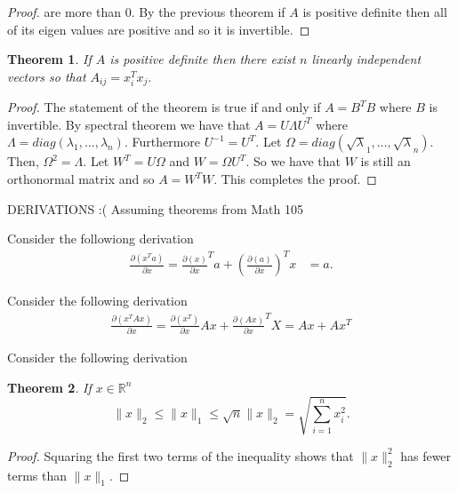 \documentclass[letter]{article}
\newtheorem{theorem}{Theorem}
\newenvironment{menumerate}{%
  \edef\backupindent{\the\parindent}%
  \enumerate%
  \setlength{\parindent}{\backupindent}%
}{\endenumerate}
\begin{document}
\begin{menumerate}
\begin{menumerate}
\begin{proof}
      are more than $0$. By the previous theorem if $A$ is positive definite then all of its eigen values
       are positive and so it is invertible.   
    \end{proof}
    \item
    \begin{theorem}
      If $A$ is positive definite then there exist $n$ linearly independent vectors so that 
      $A_{ij} = x^T_ix_j.$   
    \end{theorem}
    \begin{proof}
      The statement of the theorem is true if and only if $A = B^TB$ where $B$ is invertible. 
      By spectral theorem we have that $A = U\Lambda U^T$ where $\Lambda = diag(\lambda_1, \dots, \lambda_n).$
      Furthermore $U^{-1} = U^T$. Let $\Omega = diag(\sqrt \lambda_1, \dots, \sqrt \lambda_n).$ Then, 
      $\Omega^2 = \Lambda.$ Let $W^T = U\Omega$ and $W = \Omega U^T.$ So we have that $W$ is still an orthonormal matrix
      and so $A = W^TW.$ This completes the proof.
    \end{proof}
  \end{menumerate}
  \item DERIVATIONS :( Assuming theorems from Math 105
  \begin{menumerate}
      \item Consider the followiong derivation
      \begin{equation}
        \begin{aligned}
          \frac{\partial(x^Ta)}{\partial x} = \frac{\partial (x)}{\partial x}^T a + \left(\frac{\partial (a)}{\partial x}\right)^T x
          &= a.
        \end{aligned}
       \end{equation}
       \item Consider the following derivation
       \begin{equation}
          \begin{aligned}
              \frac{\partial(x^TAx)}{\partial x} = \frac{\partial(x^T)}{\partial x} Ax + \frac{\partial(Ax)}{\partial x}^TX = Ax + Ax^T
          \end{aligned}
       \end{equation}
       \item Consider the following derivation
       \item
       \begin{theorem}
          If $x \in \mathbb{R}^n$ 
          \begin{equation}
            \|x\|_2 \leq \|x\|_1 \leq \sqrt{n}\|x\|_2 = \sqrt{\sum_{i=1}^n x_i^2}.
          \end{equation}
       \end{theorem}
       \begin{proof}
            Squaring the first two terms of the inequality shows that
            $\|x\|_2^2$ has fewer terms than $\|x\|_1.$ 


\end{proof}
\end{menumerate}
\end{menumerate}
\end{document}
